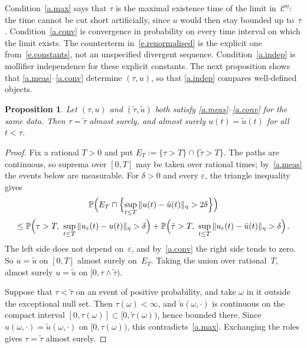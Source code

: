 \documentclass[11pt,letterpaper]{article}
\numberwithin{equation}{section}
\theoremstyle{plain}
\newtheorem{proposition}{Proposition}[section]
\theoremstyle{definition}
\theoremstyle{remark}
\newcommand{\Prob}{\mathbb{P}}
\newcommand{\Cs}{\mathcal{C}}
\newcommand{\1}{\mathbf{1}}
\begin{document}
Condition~\ref{a.max} says that $\tau$ is the maximal existence time of the limit in~$\Cs^\eta$: the time cannot be cut short artificially, since $u$ would then stay bounded up to~$\tau$. Condition~\ref{a.conv} is convergence in probability on every time interval on which the limit exists. The counterterm in~\eqref{e.renormalised} is the explicit one from~\eqref{e.constants}, not an unspecified divergent sequence. Condition~\ref{a.indep} is mollifier independence for these explicit constants. The next proposition shows that \ref{a.meas}--\ref{a.conv} determine $(\tau,u)$, so that \ref{a.indep} compares well-defined objects.

\begin{proposition}
\label{p.unique}
Let $(\tau,u)$ and $(\tilde\tau,\tilde u)$ both satisfy \ref{a.meas}--\ref{a.conv} for the same data. Then $\tau=\tilde\tau$ almost surely, and almost surely $u(t)=\tilde u(t)$ for all $t<\tau$.
\end{proposition}

\begin{proof}
Fix a rational $T>0$ and put $E_T:=\{\tau>T\}\cap\{\tilde\tau>T\}$. The paths are continuous, so suprema over $[0,T]$ may be taken over rational times; by~\ref{a.meas} the events below are measurable. For $\delta>0$ and every $\varepsilon$, the triangle inequality gives
\begin{multline*}
\Prob\Bigl(E_T\cap\Bigl\{\sup_{t\le T}\|u(t)-\tilde u(t)\|_\eta>2\delta\Bigr\}\Bigr) \\ \le \Prob\Bigl(\tau>T,\ \sup_{t\le T}\|u_\varepsilon(t)-u(t)\|_\eta>\delta\Bigr)+\Prob\Bigl(\tilde\tau>T,\ \sup_{t\le T}\|u_\varepsilon(t)-\tilde u(t)\|_\eta>\delta\Bigr)\,.
\end{multline*}
The left side does not depend on~$\varepsilon$, and by~\ref{a.conv} the right side tends to zero. So $u=\tilde u$ on $[0,T]$ almost surely on~$E_T$. Taking the union over rational~$T$, almost surely $u=\tilde u$ on $[0,\tau\wedge\tilde\tau)$.

Suppose that $\tau<\tilde\tau$ on an event of positive probability, and take $\omega$ in it outside the exceptional null set. Then $\tau(\omega)<\infty$, and $\tilde u(\omega,\cdot)$ is continuous on the compact interval $[0,\tau(\omega)]\subset[0,\tilde\tau(\omega))$, hence bounded there. Since $u(\omega,\cdot)=\tilde u(\omega,\cdot)$ on $[0,\tau(\omega))$, this contradicts~\ref{a.max}. Exchanging the roles gives $\tau=\tilde\tau$ almost surely.
\end{proof}
\end{document}
